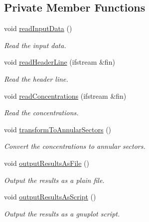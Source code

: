 \subsection*{\-Private \-Member \-Functions}
\begin{DoxyCompactItemize}
\item 
void \hyperlink{classmultiscale_1_1video_1_1CartesianToPolarConverter_a37891007ade23e05047d33d0c9cb3e13}{read\-Input\-Data} ()
\begin{DoxyCompactList}\small\item\em \-Read the input data. \end{DoxyCompactList}\item 
void \hyperlink{classmultiscale_1_1video_1_1CartesianToPolarConverter_a88d7c95fb76c9e139cb013c11a8dfae0}{read\-Header\-Line} (ifstream \&fin)
\begin{DoxyCompactList}\small\item\em \-Read the header line. \end{DoxyCompactList}\item 
void \hyperlink{classmultiscale_1_1video_1_1CartesianToPolarConverter_a7335cccc7e3c14203b00357ec6a2c140}{read\-Concentrations} (ifstream \&fin)
\begin{DoxyCompactList}\small\item\em \-Read the concentrations. \end{DoxyCompactList}\item 
void \hyperlink{classmultiscale_1_1video_1_1CartesianToPolarConverter_a0c3f499725a058d2a3251209d8c16178}{transform\-To\-Annular\-Sectors} ()
\begin{DoxyCompactList}\small\item\em \-Convert the concentrations to annular sectors. \end{DoxyCompactList}\item 
void \hyperlink{classmultiscale_1_1video_1_1CartesianToPolarConverter_adb3aeeb5f2994f8aa9dc03c8c8f270ad}{output\-Results\-As\-File} ()
\begin{DoxyCompactList}\small\item\em \-Output the results as a plain file. \end{DoxyCompactList}\item 
void \hyperlink{classmultiscale_1_1video_1_1CartesianToPolarConverter_a680e357efb54b1193715259cb339516e}{output\-Results\-As\-Script} ()
\begin{DoxyCompactList}\small\item\em \-Output the results as a gnuplot script. \end{DoxyCompactList}\end{DoxyCompactItemize}
